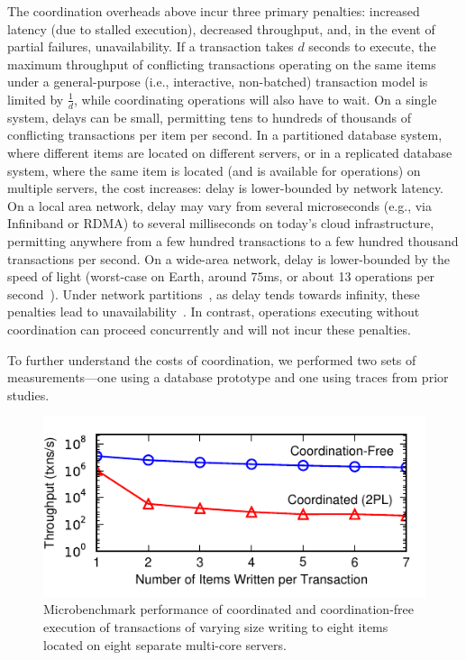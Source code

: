  The coordination overheads above
incur three primary penalties: increased latency (due to stalled
execution), decreased throughput, and, in the event of partial
failures, unavailability. If a transaction takes $d$ seconds to
execute, the maximum throughput of conflicting transactions operating
on the same items under a general-purpose (i.e., interactive,
non-batched) transaction model is limited by $\frac{1}{d}$, while
coordinating operations will also have to wait. On a single system,
delays can be small, permitting tens to hundreds of thousands of
conflicting transactions per item per second. In a partitioned
database system, where different items are located on different
servers, or in a replicated database system, where the same item is
located (and is available for operations) on multiple servers, the
cost increases: delay is lower-bounded by network latency. On a local
area network, delay may vary from several microseconds (e.g., via
Infiniband or RDMA) to several milliseconds on today's cloud
infrastructure, permitting anywhere from a few hundred transactions to
a few hundred thousand transactions per second. On a wide-area
network, delay is lower-bounded by the speed of light (worst-case on
Earth, around $75$ms, or about 13 operations per
second~\cite{hat-vldb}). Under network
partitions~\cite{queue-partitions}, as delay tends towards infinity,
these penalties lead to unavailability~\cite{gilbert-cap,hat-vldb}. In
contrast, operations executing without coordination can proceed
concurrently and will not incur these penalties.

 To further understand the
costs of coordination, we performed two sets of measurements---one using
a database prototype and one using traces from
prior studies.




\begin{figure}
\includegraphics[width=\columnwidth]{figs/micro_thru.pdf}\vspace{-.5em}
\caption{Microbenchmark performance of coordinated and
  coordination-free execution of transactions of varying size writing
  to eight items located on eight separate multi-core servers.}
\label{fig:micro}
\end{figure}

